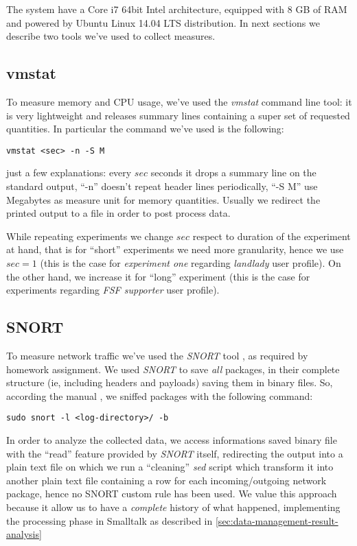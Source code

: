 \documentclass[10pt,a4paper]{article}
\begin{document}
    The system have a Core i7 64bit Intel architecture, equipped with
    8 GB of RAM and powered by Ubuntu Linux 14.04 LTS distribution. In
    next sections we describe two tools we've used to collect
    measures.

    \subsection{vmstat} 
    To measure memory and CPU usage, we've used the \emph{vmstat}
    \cite{vmstat} command line tool: it is very lightweight and
    releases summary lines containing a super set of requested
    quantities. In particular the command we've used is the following:
\begin{verbatim}
vmstat <sec> -n -S M 
\end{verbatim}
    just a few explanations: every $sec$ seconds it drops a summary
    line on the standard output, ``-n'' doesn't repeat header lines
    periodically, ``-S M'' use Megabytes as measure unit for memory
    quantities. Usually we redirect the printed output to a file in
    order to post process data.

    While repeating experiments we change $sec$ respect to duration of
    the experiment at hand, that is for ``short'' experiments we need
    more granularity, hence we use $sec = 1$ (this is the case for
    \emph{experiment one} regarding \emph{landlady} user profile). On
    the other hand, we increase it for ``long'' experiment (this is
    the case for experiments regarding \emph{FSF supporter} user
    profile).

    \subsection{SNORT} 
    To measure network traffic we've used the \emph{SNORT} tool
    \cite{SNORT}, as required by homework assignment. We used
    \emph{SNORT} to save \emph{all} packages, in their complete
    structure (ie, including headers and payloads) saving them in
    binary files.  So, according the manual \cite{SNORT-manual}, we
    sniffed packages with the following command:
\begin{verbatim}
sudo snort -l <log-directory>/ -b
\end{verbatim}
    In order to analyze the collected data, we access informations
    saved binary file with the ``read'' feature provided by
    \emph{SNORT} itself, redirecting the output into a plain text file
    on which we run a ``cleaning'' \emph{sed}\cite{sed} script which
    transform it into another plain text file containing a row for
    each incoming/outgoing network package, hence no SNORT custom rule
    has been used. We value this approach because it allow us to have
    a \emph{complete} history of what happened, implementing the
    processing phase in Smalltalk as described in
    \autoref{sec:data-management-result-analysis}
\end{document}

